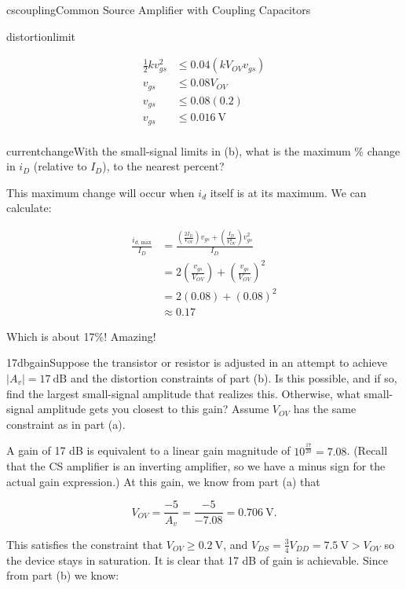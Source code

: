 \begin{mainquestion}{cscoupling}{Common Source Amplifier with Coupling Capacitors}
\begin{partquestion}{distortionlimit}
\begin{answer}
\begin{align*}
    \frac{1}{2}k v_{gs}^2 &\leq 0.04 (k V_{OV} v_{gs}) \\
    v_{gs} &\leq 0.08 V_{OV} \\
    v_{gs} &\leq 0.08 (0.2) \\
    v_{gs} &\leq \qty{0.016}{\volt} \\
\end{align*}
\end{answer}
\end{partquestion}

\begin{partquestion}{currentchange}{With the small-signal limits in (b), what is the maximum \% change in $i_{D}$ (relative to $I_{D}$), to the nearest percent?}
\begin{answer}
This maximum change will occur when $i_{d}$ itself is at its maximum. We can calculate:

\begin{align*}
    \frac{i_{d\text{, max}}}{I_D} &= \frac{\left(\frac{2 I_D}{V_{OV}}\right)v_{gs} + \left(\frac{I_D}{V_{OV}^2}\right)v_{gs}^2}{I_D}\\
    &= 2\left(\frac{v_{gs}}{V_{OV}}\right) + \left(\frac{v_{gs}}{V_{OV}}\right)^2\\
    &= 2(0.08) + (0.08)^2\\
    &\approx 0.17
\end{align*}

Which is about 17\%! Amazing!
\end{answer}
\end{partquestion}

\begin{partquestion}{17dbgain}{Suppose the transistor or resistor is adjusted in an attempt to achieve $\left|A_{v}\right| = 17\ \text{dB}$ and the distortion constraints of part (b). Is this possible, and if so, find the largest small-signal amplitude that realizes this. Otherwise, what small-signal amplitude gets you closest to this gain? Assume $V_{OV}$ has the same constraint as in part (a).}
\begin{answer}
A gain of 17 dB is equivalent to a linear gain magnitude of $10^{\frac{17}{20}} = 7.08$. (Recall that the CS amplifier is an inverting amplifier, so we have a minus sign for the actual gain expression.) At this gain, we know from part (a) that

\[
V_{OV} = \frac{-5}{A_{v}} = \frac{-5}{-7.08} = \qty{0.706}{\volt}.
\]

This satisfies the constraint that $V_{OV} \geq \qty{0.2}{\volt}$, and $V_{DS} = \frac{3}{4}V_{DD} = \qty{7.5}{\volt} > V_{OV}$ so the device stays in saturation. It is clear that 17 dB of gain is achievable. Since from part (b) we know:


\end{answer}
\end{partquestion}
\end{mainquestion}
